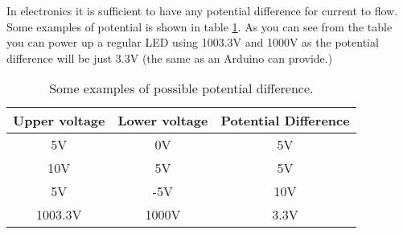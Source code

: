 \documentclass[../sparc.tex]{subfiles}
\begin{document}
In electronics it is sufficient to have any potential difference for current to
flow.  Some examples of potential is shown in table
\ref{table:electronics-potential-difference}.  As you can see from the table you
can power up a regular LED using 1003.3V and 1000V as the potential difference
will be just 3.3V (the same as an Arduino can provide.)

\begin{table}[h]
  \centering
  \begin{tabular}{c | c | c}
    Upper voltage & Lower voltage & Potential Difference \\
    \hline
    5V & 0V & 5V \\
    \hline
    10V & 5V & 5V \\
    \hline
    5V & -5V & 10V \\
    \hline
    1003.3V & 1000V & 3.3V \\
    \hline
  \end{tabular}
  \caption{Some examples of possible potential difference.}
  \label{table:electronics-potential-difference}
\end{table}
\end{document}
